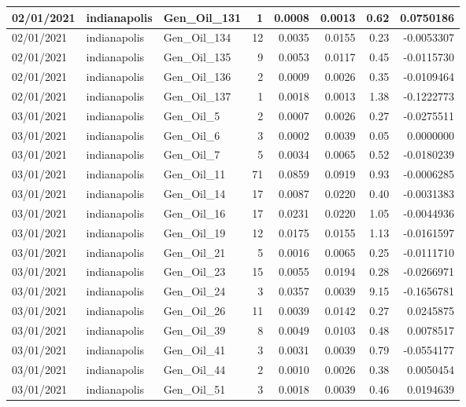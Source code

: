 \documentclass[
  letterpaper,
  DIV=11,
  numbers=noendperiod]{scrartcl}
\begin{document}
\begin{tabular}{l|l|l|r|r|r|r|r}
\hline
02/01/2021 & indianapolis & Gen\_Oil\_131 & 1 & 0.0008 & 0.0013 & 0.62 & 0.0750186\\
\hline
02/01/2021 & indianapolis & Gen\_Oil\_134 & 12 & 0.0035 & 0.0155 & 0.23 & -0.0053307\\
\hline
02/01/2021 & indianapolis & Gen\_Oil\_135 & 9 & 0.0053 & 0.0117 & 0.45 & -0.0115730\\
\hline
02/01/2021 & indianapolis & Gen\_Oil\_136 & 2 & 0.0009 & 0.0026 & 0.35 & -0.0109464\\
\hline
02/01/2021 & indianapolis & Gen\_Oil\_137 & 1 & 0.0018 & 0.0013 & 1.38 & -0.1222773\\
\hline
03/01/2021 & indianapolis & Gen\_Oil\_5 & 2 & 0.0007 & 0.0026 & 0.27 & -0.0275511\\
\hline
03/01/2021 & indianapolis & Gen\_Oil\_6 & 3 & 0.0002 & 0.0039 & 0.05 & 0.0000000\\
\hline
03/01/2021 & indianapolis & Gen\_Oil\_7 & 5 & 0.0034 & 0.0065 & 0.52 & -0.0180239\\
\hline
03/01/2021 & indianapolis & Gen\_Oil\_11 & 71 & 0.0859 & 0.0919 & 0.93 & -0.0006285\\
\hline
03/01/2021 & indianapolis & Gen\_Oil\_14 & 17 & 0.0087 & 0.0220 & 0.40 & -0.0031383\\
\hline
03/01/2021 & indianapolis & Gen\_Oil\_16 & 17 & 0.0231 & 0.0220 & 1.05 & -0.0044936\\
\hline
03/01/2021 & indianapolis & Gen\_Oil\_19 & 12 & 0.0175 & 0.0155 & 1.13 & -0.0161597\\
\hline
03/01/2021 & indianapolis & Gen\_Oil\_21 & 5 & 0.0016 & 0.0065 & 0.25 & -0.0111710\\
\hline
03/01/2021 & indianapolis & Gen\_Oil\_23 & 15 & 0.0055 & 0.0194 & 0.28 & -0.0266971\\
\hline
03/01/2021 & indianapolis & Gen\_Oil\_24 & 3 & 0.0357 & 0.0039 & 9.15 & -0.1656781\\
\hline
03/01/2021 & indianapolis & Gen\_Oil\_26 & 11 & 0.0039 & 0.0142 & 0.27 & 0.0245875\\
\hline
03/01/2021 & indianapolis & Gen\_Oil\_39 & 8 & 0.0049 & 0.0103 & 0.48 & 0.0078517\\
\hline
03/01/2021 & indianapolis & Gen\_Oil\_41 & 3 & 0.0031 & 0.0039 & 0.79 & -0.0554177\\
\hline
03/01/2021 & indianapolis & Gen\_Oil\_44 & 2 & 0.0010 & 0.0026 & 0.38 & 0.0050454\\
\hline
03/01/2021 & indianapolis & Gen\_Oil\_51 & 3 & 0.0018 & 0.0039 & 0.46 & 0.0194639\\

\end{tabular}
\end{document}

